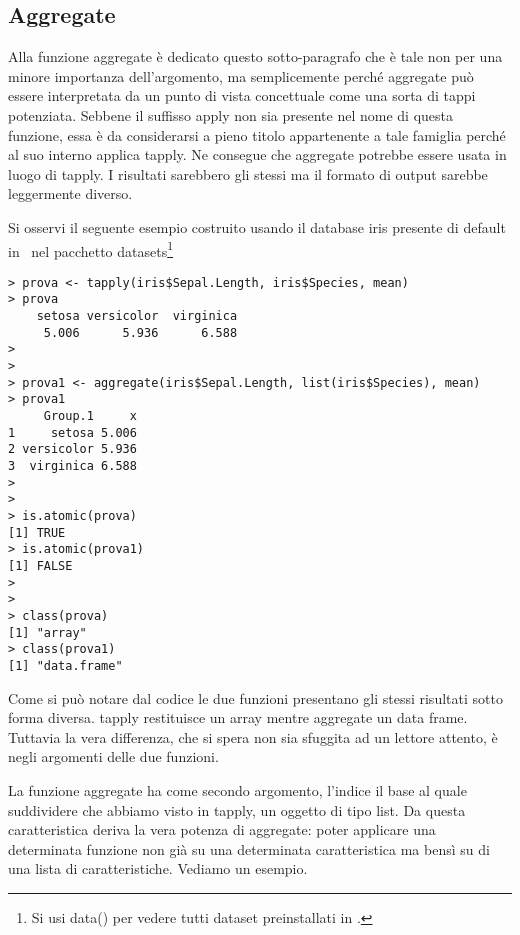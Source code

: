 \subsection{Aggregate}

Alla funzione aggregate è dedicato questo sotto-paragrafo che è tale non per una minore importanza dell'argomento, ma semplicemente perché aggregate può essere interpretata da un punto di vista concettuale come una sorta di tappi potenziata. Sebbene il suffisso apply non sia presente nel nome di questa funzione, essa è da considerarsi a pieno titolo appartenente a tale famiglia perché al suo interno applica tapply. Ne consegue che aggregate potrebbe essere usata in luogo di tapply. I risultati sarebbero gli stessi ma il formato di output sarebbe leggermente diverso.

Si osservi il seguente esempio costruito usando il database iris presente di default in \erre\ nel pacchetto datasets\footnote{Si usi data() per vedere tutti dataset preinstallati in \erre. }
\begin{lstlisting}	
> prova <- tapply(iris$Sepal.Length, iris$Species, mean)
> prova
    setosa versicolor  virginica 
     5.006      5.936      6.588 
>
>
> prova1 <- aggregate(iris$Sepal.Length, list(iris$Species), mean)
> prova1
     Group.1     x
1     setosa 5.006
2 versicolor 5.936
3  virginica 6.588
>
>
> is.atomic(prova)
[1] TRUE
> is.atomic(prova1)
[1] FALSE
>
>
> class(prova)
[1] "array"
> class(prova1)
[1] "data.frame"
\end{lstlisting}

Come si può notare dal codice le due funzioni presentano gli stessi risultati sotto forma diversa. tapply restituisce un array mentre aggregate un data frame. Tuttavia la vera differenza, che si spera non sia sfuggita ad un lettore attento, è negli argomenti delle due funzioni.

La funzione aggregate ha come secondo argomento, l'indice il base al quale suddividere che abbiamo visto in tapply, un oggetto di tipo list. Da questa caratteristica deriva la vera potenza di aggregate: poter applicare una determinata funzione non già su una determinata caratteristica ma bensì su di una lista di caratteristiche. Vediamo un esempio.

